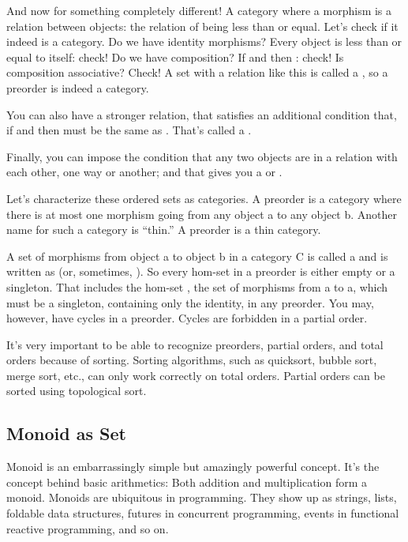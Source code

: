 And now for something completely different! A category where a morphism
is a relation between objects: the relation of being less than or equal.
Let's check if it indeed is a category. Do we have identity morphisms?
Every object is less than or equal to itself: check! Do we have
composition? If  and  then : check! Is composition associative? Check! A set with a
relation like this is called a , so a preorder is indeed
a category.

You can also have a stronger relation, that satisfies an additional
condition that, if  and  then  must be
the same as . That's called a .

Finally, you can impose the condition that any two objects are in a
relation with each other, one way or another; and that gives you a
 or .

Let's characterize these ordered sets as categories. A preorder is a
category where there is at most one morphism going from any object a to
any object b. Another name for such a category is ``thin.'' A preorder
is a thin category.

A set of morphisms from object a to object b in a category C is called a
 and is written as  (or, sometimes,
). So every hom-set in a preorder is either
empty or a singleton. That includes the hom-set , the set of
morphisms from a to a, which must be a singleton, containing only the
identity, in any preorder. You may, however, have cycles in a preorder.
Cycles are forbidden in a partial order.

It's very important to be able to recognize preorders, partial orders,
and total orders because of sorting. Sorting algorithms, such as
quicksort, bubble sort, merge sort, etc., can only work correctly on
total orders. Partial orders can be sorted using topological sort.

\subsection{Monoid as Set}\label{monoid-as-set}

Monoid is an embarrassingly simple but amazingly powerful concept. It's
the concept behind basic arithmetics: Both addition and multiplication
form a monoid. Monoids are ubiquitous in programming. They show up as
strings, lists, foldable data structures, futures in concurrent
programming, events in functional reactive programming, and so on.

